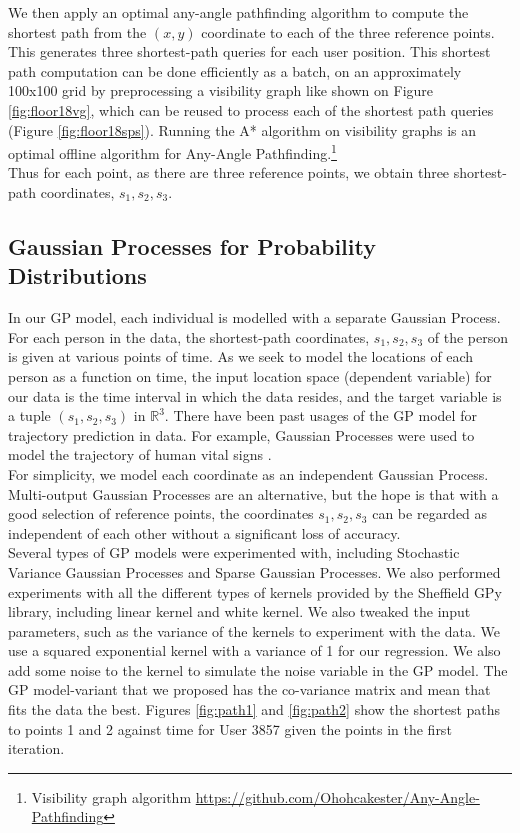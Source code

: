 \documentclass[letterpaper]{article}
\begin{document}
We then apply an optimal any-angle pathfinding algorithm to compute the shortest path from the $(x,y)$ coordinate to each of the three reference points. This generates three shortest-path queries for each user position. This shortest path computation can be done efficiently as a batch, on an approximately 100x100 grid by preprocessing a visibility graph like shown on Figure \ref{fig:floor18vg}, which can be reused to process each of the shortest path queries (Figure \ref{fig:floor18sps}). Running the A* algorithm on visibility graphs is an optimal offline algorithm for Any-Angle Pathfinding.\footnote{Visibility graph algorithm \url{https://github.com/Ohohcakester/Any-Angle-Pathfinding}}\\

Thus for each point, as there are three reference points, we obtain three shortest-path coordinates, $s_1, s_2, s_3$.

\subsection{Gaussian Processes for Probability Distributions}

In our GP model, each individual is modelled with a separate Gaussian Process. For each person in the data, the shortest-path coordinates, $s_1, s_2, s_3$ of the person is given at various points of time. As we seek to model the locations of each person as a function on time, the input location space (dependent variable) for our data is the time interval in which the data resides, and the target variable is a tuple $(s_1, s_2, s_3)$ in $\mathbb{R}^3$. There have been past usages of the GP model for trajectory prediction in data. For example, Gaussian Processes were used to model the trajectory of human vital signs \cite{vitalsigns}.\\

For simplicity, we model each coordinate as an independent Gaussian Process. Multi-output Gaussian Processes \cite{achan} are an alternative, but the hope is that with a good selection of reference points, the coordinates $s_1, s_2, s_3$ can be regarded as independent of each other without a significant loss of accuracy.\\

Several types of GP models were experimented with, including Stochastic Variance Gaussian Processes and Sparse Gaussian Processes. We also performed experiments with all the different types of kernels provided by the Sheffield GPy library, including linear kernel and white kernel. We also tweaked the input parameters, such as the variance of the kernels to experiment with the data. We use a squared exponential kernel with a variance of 1 for our regression. We also add some noise to the kernel to simulate the noise variable in the GP model. The GP model-variant that we proposed has the co-variance matrix and mean that fits the data the best. Figures \ref{fig:path1} and \ref{fig:path2} show the shortest paths to points 1 and 2 against time for User 3857 given the points in the first iteration.\\
\end{document}
